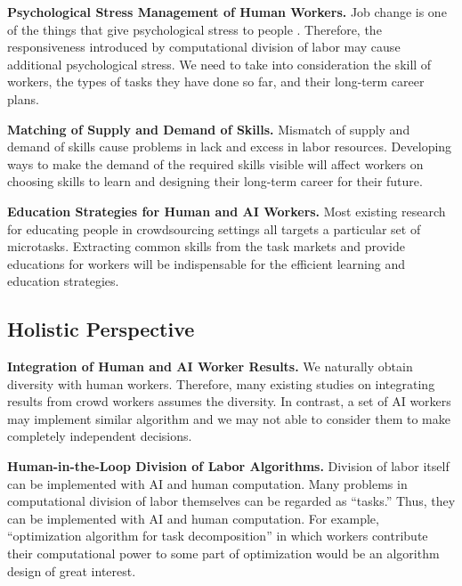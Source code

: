 \noindent
{\bf Psychological Stress Management of Human Workers.}
Job change is one of the things that give psychological stress to people \cite{GK11}. 
Therefore, the responsiveness introduced by computational division of labor may cause additional psychological stress. We need to take into consideration the skill of workers, the types of tasks they have done so far, and their long-term career plans.

\noindent
{\bf Matching of Supply and Demand of Skills.} Mismatch of supply and demand of skills cause problems in lack and excess in labor resources. Developing ways to make the demand of the required skills visible will affect workers on choosing skills to learn and designing their long-term career for their future. 

\noindent
{\bf Education Strategies for Human and AI Workers.}
Most existing research for educating people in crowdsourcing settings all targets a particular set of microtasks. 
Extracting common skills from the task markets and provide educations for workers will be indispensable for the efficient learning and education strategies.


\subsection{Holistic Perspective}

\noindent
{\bf Integration of Human and AI Worker Results.}
We naturally obtain diversity with human workers. Therefore, many existing studies on integrating results from crowd workers assumes the diversity.
In contrast, a set of AI workers may implement similar algorithm and we may not able to consider them to make completely independent decisions. 

\noindent
{\bf Human-in-the-Loop Division of Labor Algorithms.} Division of labor itself can be implemented with AI and human computation.
Many problems in computational division of labor themselves can be regarded as ``tasks.'' Thus, they can be implemented with AI and human computation. For example, ``optimization algorithm for task decomposition'' in which workers contribute their computational power to some part of optimization would be an
algorithm design of great interest.

